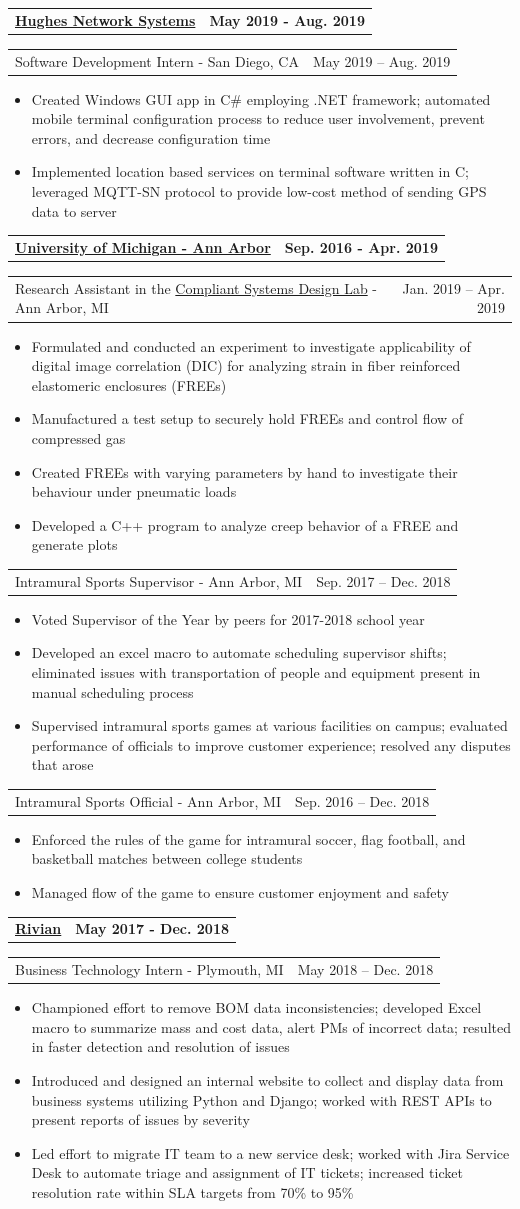 \documentclass[letterpaper,11pt]{article}
\makeatletter
\newcommand{\resumeItem}[1]{
	\item\small{
		#1
	}
}
\newcommand{\resumeCompanyHeading}[2]{
  \vspace{-1pt}\item
    \begin{tabular*}{0.97\textwidth}[t]{l@{\extracolsep{\fill}}r}
      \textbf{#1} & \textbf{#2} \\
    \end{tabular*}\vspace{-0pt}
}
\newcommand{\resumeJobHeading}[3]{
	\vspace{-1pt}
	\begin{tabular*}{0.97\textwidth}[t]{l@{\extracolsep{\fill}}r}
		{\small#1} - {\small #2} & {\small #3} \\
	\end{tabular*}\vspace{-4pt}
}
\newcommand{\resumeItemListStart}{\begin{itemize}}
\newcommand{\resumeItemListEnd}{\end{itemize}\vspace{-4pt}}
\makeatother
\begin{document}
\resumeCompanyHeading{\href{https://www.hughes.com/}{Hughes Network Systems}}{May 2019 - Aug. 2019}
\resumeJobHeading{Software Development Intern}{San Diego, CA}{May 2019 -- Aug. 2019}
\resumeItemListStart
\resumeItem{Created Windows GUI app in C\# employing .NET framework; automated mobile terminal configuration process to reduce user involvement, prevent errors, and decrease configuration time}
\resumeItem{Implemented location based services on terminal software written in C; leveraged MQTT-SN protocol to provide low-cost method of sending GPS data to server}
\resumeItemListEnd

\resumeCompanyHeading{\href{https://umich.edu/}{University of Michigan - Ann Arbor}}{Sep. 2016 - Apr. 2019}
\resumeJobHeading{Research Assistant in the \href{http://csdl.engin.umich.edu/}{Compliant Systems Design Lab}}{Ann Arbor, MI}{Jan. 2019 -- Apr. 2019}
\resumeItemListStart
\resumeItem{Formulated and conducted an experiment to investigate applicability of digital image correlation (DIC) for analyzing strain in fiber reinforced elastomeric enclosures (FREEs)}
\resumeItem{Manufactured a test setup to securely hold FREEs and control flow of compressed gas}
\resumeItem{Created FREEs with varying parameters by hand to investigate their behaviour under pneumatic loads}
\resumeItem{Developed a C++ program to analyze creep behavior of a FREE and generate plots}
\resumeItemListEnd

\resumeJobHeading{Intramural Sports Supervisor}{Ann Arbor, MI}{Sep. 2017 -- Dec. 2018}
\resumeItemListStart
\resumeItem{Voted Supervisor of the Year by peers for 2017-2018 school year}
\resumeItem{Developed an excel macro to automate scheduling supervisor shifts; eliminated issues with transportation of people and equipment present in manual scheduling process}
\resumeItem{Supervised intramural sports games at various facilities on campus; evaluated performance of officials to improve customer experience; resolved any disputes that arose}
\resumeItemListEnd

\resumeJobHeading{Intramural Sports Official}{Ann Arbor, MI}{Sep. 2016 -- Dec. 2018}
\resumeItemListStart
\resumeItem{Enforced the rules of the game for intramural soccer, flag football, and basketball matches between college students}
\resumeItem{Managed flow of the game to ensure customer enjoyment and safety}
\resumeItemListEnd

\resumeCompanyHeading{\href{https://rivian.com/}{Rivian}}{May 2017 - Dec. 2018}
\resumeJobHeading{Business Technology Intern}{Plymouth, MI}{May 2018 -- Dec. 2018}
\resumeItemListStart
\resumeItem{Championed effort to remove BOM data inconsistencies; developed Excel macro to summarize mass and cost data, alert PMs of incorrect data; resulted in faster detection and resolution of issues}
\resumeItem{Introduced and designed an internal website to collect and display data from business systems utilizing Python and Django; worked with REST APIs to present reports of issues by severity}
\resumeItem{Led effort to migrate IT team to a new service desk; worked with Jira Service Desk to automate triage and assignment of IT tickets; increased ticket resolution rate within SLA targets from 70\% to 95\%}
\resumeItemListEnd
\end{document}
